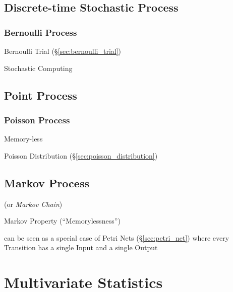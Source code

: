 \subsection{Discrete-time Stochastic Process}
\label{sec:discretetime_stochastic}

\subsubsection{Bernoulli Process}\label{sec:bernoulli_process}

Bernoulli Trial (\S\ref{sec:bernoulli_trial})

Stochastic Computing



\subsection{Point Process}\label{sec:point_process}

\subsubsection{Poisson Process}\label{sec:poisson_process}

Memory-less

Poisson Distribution (\S\ref{sec:poisson_distribution})



\subsection{Markov Process}\label{sec:markov_process}

(or \emph{Markov Chain})

Markov Property (``Memorylessness'')

can be seen as a special case of Petri Nets (\S\ref{sec:petri_net})
where every Transition has a single Input and a single Output



\section{Multivariate Statistics}\label{sec:multivariate_statistics}

